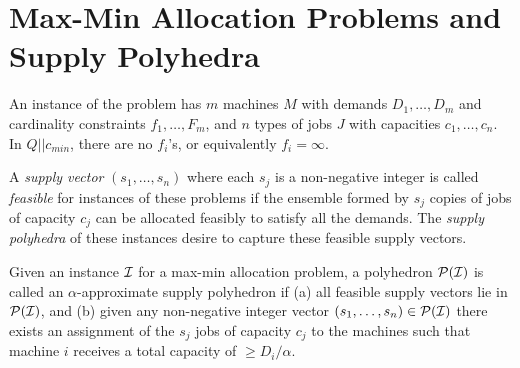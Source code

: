 \section{Max-Min Allocation Problems and Supply Polyhedra}\label{sec:supplypolyhedra}
An instance of the \cckp problem has $m$ machines $M$ with demands $D_1,\ldots,D_m$ and cardinality constraints $f_1,\ldots, F_m$, and $n$  types of jobs $J$ with capacities $c_1,\ldots,c_n$. 
In $Q||c_{min}$, there are no $f_i$'s, or equivalently $f_i = \infty$.

A {\em supply vector} $(s_1,\ldots,s_n)$ where each $s_j$ is a non-negative integer
is called {\em feasible} for instances of these problems if the ensemble formed by $s_j$ copies of jobs of capacity $c_j$ can be allocated feasibly to satisfy all the demands.
The {\em supply polyhedra} of these instances desire to capture these feasible supply vectors.

\begin{definition}\label{def:supp-poly}
	Given an instance ${\cal I}$ for a max-min allocation problem, a polyhedron ${\cal P}({\cal I})$ is called an $\alpha$-approximate supply polyhedron if 
	(a) all feasible supply vectors lie in ${\cal P}({\cal I})$, and (b) given any non-negative integer vector $(s_1,\ldots,s_n)\in {\cal P}({\cal I})$ there exists an assignment
	of the $s_j$ jobs of capacity $c_j$ to the machines such that machine $i$ receives a total capacity of $\geq D_i/\alpha$.
\end{definition}

